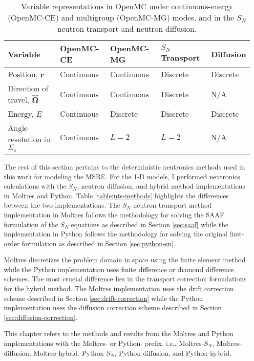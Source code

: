 \begin{table}[htb!]
  \centering
  \footnotesize
  \caption{Variable representations in OpenMC under continuous-energy (OpenMC-CE) and multigroup
  (OpenMC-MG) modes, and in the $S_N$ neutron transport and neutron diffusion.}
  \begin{tabular}{l l l l l}
    \toprule
    Variable & OpenMC-CE & OpenMC-MG & $S_N$ Transport & Diffusion \\
    \midrule
    Position, $\bm{r}$ & Continuous & Continuous & Discrete & Discrete \\
    Direction of travel, $\bm{\hat{\Omega}}$ & Continuous & Continuous & Discrete & N/A \\
    Energy, $E$ & Continuous & Discrete & Discrete & Discrete \\
    Angle resolution in $\Sigma_s$ & Continuous & $L=2$ & $L=2$ & N/A \\
    \bottomrule
  \end{tabular}
  \label{table:var}
\end{table}

The rest of this section pertains to the deterministic neutronics methods used in this work for
modeling the \gls{MSRE}.
For the 1-D models, I performed neutronics calculations with the $S_N$, neutron diffusion, and
hybrid method implementations in Moltres and Python. Table \ref{table:nts-methods} highlights the
differences between the two implementations. The $S_N$ neutron transport method implementation in
Moltres follows the methodology for solving the \gls{SAAF} formulation of the $S_N$ equations as
described in Section \ref{sec:saaf} while the implementation in Python follows the methodology
for solving the original first-order formulation as described in Section \ref{sec:python-sn}.

Moltres discretizes the problem domain in space using the finite element
method while the Python implementation uses finite difference or diamond difference schemes. The
most crucial difference lies in the transport correction formulations for the hybrid method. The
Moltres implementation uses the drift correction scheme described in Section
\ref{sec:drift-correction} while the Python implementation uses the diffusion correction
scheme described in Section \ref{sec:diffusion-correction}.

This chapter refers to the methods and results from the Moltres and Python implementations
with the Moltres- or Python- prefix, i.e., Moltres-$S_N$, Moltres-diffusion, Moltres-hybrid,
Python-$S_N$, Python-diffusion, and Python-hybrid.

